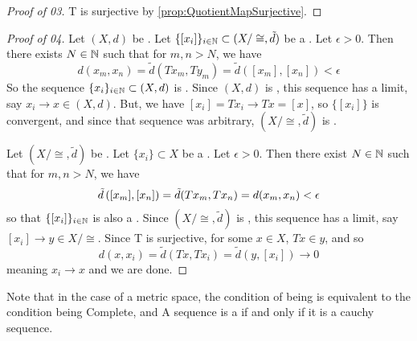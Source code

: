 \begin{prop}
\begin{proof}[Proof of 03]
        T is surjective by \ref{prop:QuotientMapSurjective}.
    \end{proof}
    \begin{proof}[Proof of 04]
        Let $(X,d)$ be \PseudometricComplete. 
        Let $\{[x_i]\}_{i \in \mathbb{N}} \subset (X/\cong, \tilde{d})$ be a \PseudometricCauchySequence. 
        Let $\epsilon > 0$. 
        Then there exists $N \in \mathbb{N}$ such that for $m,n > N$, we have 
        \begin{equation}
            d(x_m, x_n) = \tilde{d}(Tx_m, Ty_m) =\tilde{d}([x_m], [x_n]) < \epsilon
        \end{equation}
        So the sequence $\{x_i\}_{ i \in \mathbb{N}} \subset (X,d)$ is \PseudometricCauchySequence. 
        Since $(X,d)$ is \PseudometricComplete, this sequence has a limit, say $x_i \to x \in (X,d)$. 
        But, we have $[x_i]=Tx_i \to Tx = [x]$, so $\{[x_i]\}$ is convergent, and since that sequence was arbitrary, $(X/\cong, \tilde{d})$ is \PseudometricComplete. 
        
        Let $(X/\cong, \tilde{d})$ be \PseudometricComplete. 
        Let $\{x_i\} \subset X$ be a \PseudometricCauchySequence.
        Let $\epsilon > 0$. Then there exist $N \in \mathbb{N}$ such that for $m,n > N$, we have
        \begin{equation}
            \tilde{d}\left( [x_m], [x_n]\right) = \tilde{d}(Tx_m, Tx_n) = d(x_m, x_n) < \epsilon
        \end{equation}
        so that $\{[x_i]\}_{i \in \mathbb{N}}$ is also a \PseudometricCauchySequence. 
        Since $(X/\cong, \tilde{d})$ is \PseudometricComplete, this sequence has a limit, say $[x_i] \to y \in X/\cong$. 
        Since T is surjective, for some $x \in X$, $Tx \in y$, and so
        \begin{equation}
            d(x, x_i) = \tilde{d}(Tx, Tx_i) =\tilde{d}(y, [x_i]) \to 0
        \end{equation}
        meaning $x_i \to x$ and we are done. 
                
\end{proof}
\end{prop}

\begin{rmk}

Note that in the case of a metric space, 
the condition of being
\PseudometricComplete is equivalent to 
the condition being
Complete,  and
A sequence is a 
\PseudometricCauchySequence 
if and only if it is a cauchy sequence. 
\end{rmk}
